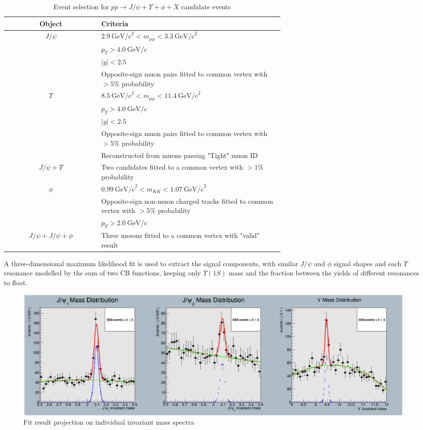 \documentclass[10pt,twocolumn]{article}
\newcommand*{\GeVc}{~\text{GeV/c}}
\newcommand*{\GeVcs}{~\text{GeV/c}^2}
\begin{document}
\begin{table}[]
    \centering
    \caption{Event selection for $pp\to J/\psi+\Upsilon+\phi+X$ candidate events\\}
    \begin{tabular}{c p{0.66\linewidth}}
        \toprule
        \textbf{Object} & \textbf{Criteria} \\
        \midrule
        $J/\psi$ & $2.9 \GeVcs < m_{\mu\mu} < 3.3 \GeVcs$ \\
                 & $p_T > 4.0\GeVc$ \\
                 & $|y| < 2.5$ \\
                 & Opposite-sign muon pairs fitted to common vertex with $> 5\%$ probability \\
                 \midrule
        $\Upsilon$ & $8.5\GeVcs < m_{\mu\mu} < 11.4 \GeVcs$ \\
                 & $p_T > 4.0\GeVc$ \\
                 & $|y| < 2.5$ \\
                 & Opposite-sign muon pairs fitted to common vertex with $> 5\%$ probability \\
                 & Reconstructed from muons passing "Tight" muon ID \\
                 \midrule
        $J/\psi+\Upsilon$ & Two candidates fitted to a common vertex with $> 1\%$ probability \\
        \midrule
        $\phi$ & $0.99 \GeVcs < m_{KK} < 1.07 \GeVcs$ \\
               & Opposite-sign non-muon charged tracks fitted to common vertex with $> 5\%$ probability \\
               & $p_T > 2.0\GeVc$ \\
               \midrule
        $J/\psi+J/\psi+\phi$ & Three mesons fitted to a common vertex with "valid" result \\
        \bottomrule
    \end{tabular}
    \label{tab:cut_JpsiYPhi}
\end{table}

A three-dimensional maximum likelihood fit is used to extract the signal components, with similar $J/\psi$ and $\phi$ signal shapes and each $\Upsilon$ resonance modelled by the sum of two CB functions, keeping only $\Upsilon(1S)$ mass and the fraction between the yields of different resonances to float.

\begin{figure}
    \centering
    \includegraphics[width=1.0\linewidth]{images/JpsiJpsiY_fit.png}
    \caption{Fit result projection on individual invariant mass spectra}
    \label{fig:JpsiYPhi_fit}
\end{figure}
\end{document}
